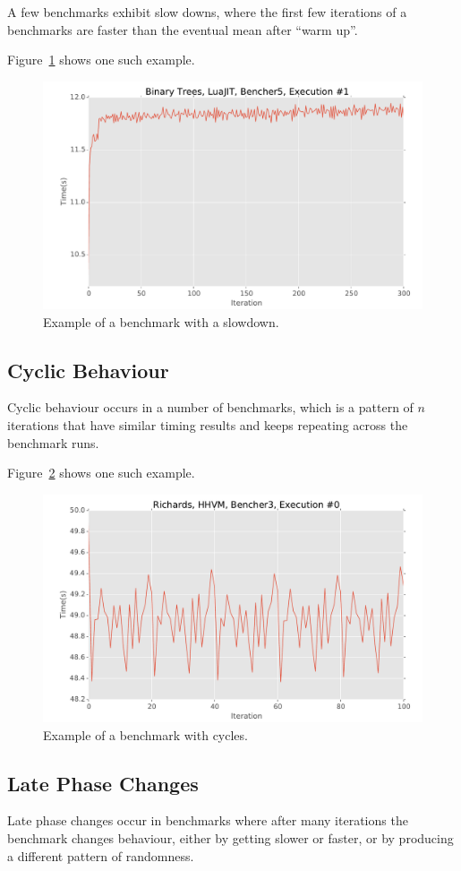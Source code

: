 \documentclass[a4paper,UKenglish]{lipics}
\begin{document}
A few benchmarks exhibit slow downs, where the first few iterations of a
benchmarks are faster than the eventual mean after ``warm up''.

Figure~\ref{fig:examples:slowdown1} shows one such example.

\begin{figure}[h!]
\centering
\includegraphics[width=.46\textwidth]{examples/slowdown1}
\caption{Example of a benchmark with a slowdown.}
\label{fig:examples:slowdown1}
\end{figure}



\subsection{Cyclic Behaviour}
\label{sub:cyclic}

Cyclic behaviour occurs in a number of benchmarks, which is a pattern of $n$
iterations that have similar timing results and keeps repeating across the
benchmark runs.

Figure~\ref{fig:examples:cycles1} shows one such example.

\begin{figure}[h!]
\centering
\includegraphics[width=.46\textwidth]{examples/cycles1}
\caption{Example of a benchmark with cycles.}
\label{fig:examples:cycles1}
\end{figure}


\subsection{Late Phase Changes}
\label{sub:phase}

Late phase changes occur in benchmarks where after many iterations the benchmark
changes behaviour, either by getting slower or faster, or by producing a
different pattern of randomness.
\end{document}
